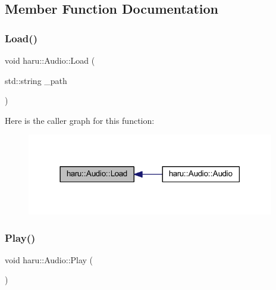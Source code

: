 \subsection{Member Function Documentation}
\mbox{\label{classharu_1_1_audio_a910757e64404e79e74f027189c56acd5}} 
\subsubsection{\texorpdfstring{Load()}{Load()}}
{\footnotesize\ttfamily void haru\+::\+Audio\+::\+Load (\begin{DoxyParamCaption}\item[{std\+::string}]{\+\_\+path }\end{DoxyParamCaption})}

Here is the caller graph for this function\+:
\nopagebreak
\begin{figure}[H]
\begin{center}
\leavevmode
\includegraphics[width=306pt]{classharu_1_1_audio_a910757e64404e79e74f027189c56acd5_icgraph}
\end{center}
\end{figure}
\mbox{\label{classharu_1_1_audio_abedc73a31046f365320e7202d7c04b03}} 
\subsubsection{\texorpdfstring{Play()}{Play()}\hspace{0.1cm}{\footnotesize\ttfamily [1/2]}}
{\footnotesize\ttfamily void haru\+::\+Audio\+::\+Play (\begin{DoxyParamCaption}{ }\end{DoxyParamCaption})}

\mbox{\label{classharu_1_1_audio_a0f9082d935880d64f4ee92493cfedf61}} 

